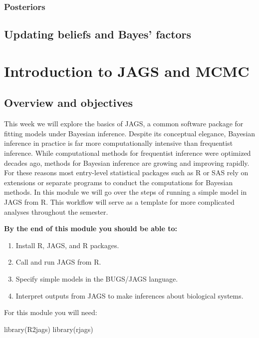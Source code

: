\documentclass[
  13,
  letterpaper,
]{report}
\newenvironment{Shaded}{\begin{snugshade}}{\end{snugshade}}
\newcommand{\FunctionTok}[1]{\textcolor[rgb]{0.28,0.35,0.67}{#1}}
\newcommand{\NormalTok}[1]{\textcolor[rgb]{0.00,0.23,0.31}{#1}}
\providecommand{\tightlist}{%
  \setlength{\itemsep}{0pt}\setlength{\parskip}{0pt}}
\begin{document}
\subsection{Posteriors}\label{posteriors}

\section{Updating beliefs and Bayes'
factors}\label{updating-beliefs-and-bayes-factors}

\chapter{Introduction to JAGS and MCMC}\label{sec-jags}

\section{Overview and objectives}\label{overview-and-objectives}

This week we will explore the basics of JAGS, a common software package
for fitting models under Bayesian inference. Despite its conceptual
elegance, Bayesian inference in practice is far more computationally
intensive than frequentist inference. While computational methods for
frequentist inference were optimized decades ago, methods for Bayesian
inference are growing and improving rapidly. For these reasons most
entry-level statistical packages such as R or SAS rely on extensions or
separate programs to conduct the computations for Bayesian methods. In
this module we will go over the steps of running a simple model in JAGS
from R. This workflow will serve as a template for more complicated
analyses throughout the semester.

\textbf{By the end of this module you should be able to:}

\begin{enumerate}
\def\labelenumi{\arabic{enumi}.}
\tightlist
\item
  Install R, JAGS, and R packages.
\item
  Call and run JAGS from R.
\item
  Specify simple models in the BUGS/JAGS language.
\item
  Interpret outputs from JAGS to make inferences about biological
  systems.
\end{enumerate}

For this module you will need:

\begin{Shaded}
\begin{Highlighting}[]
\FunctionTok{library}\NormalTok{(R2jags)}
\FunctionTok{library}\NormalTok{(rjags)}
\end{Highlighting}
\end{Shaded}
\end{document}
